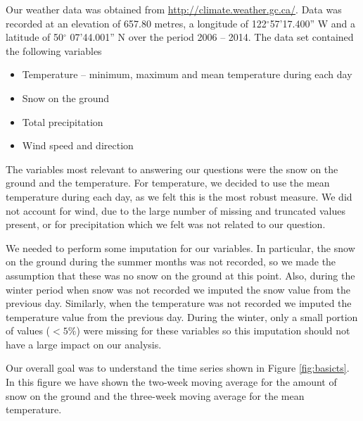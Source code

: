 \documentclass[12pt,twoside]{article}
\begin{document}
{Our weather data was obtained from \url{http://climate.weather.gc.ca/}. Data was recorded at an elevation of 657.80 metres, a longitude of 122$^{\circ}$57'17.400'' W and a latitude of 50$^{\circ}$ 07'44.001'' N over the period 2006 -- 2014. The data set contained the following variables

\begin{itemize}
\item Temperature -- minimum, maximum and mean temperature during each day
\item Snow on the ground 
\item Total precipitation 
\item Wind speed and direction
\end{itemize}

\vspace{-3mm}
\medskip The variables most relevant to answering our questions were the snow on the ground and the temperature. For temperature, we decided to use the mean temperature during each day, as we felt this is the most robust measure. We did not account for wind, due to the large number of missing and truncated values present, or for precipitation which we felt was not related to our question. 

We needed to perform some imputation for our variables. In particular, the snow on the ground during the summer months was not recorded, so we made the assumption that these was no snow on the ground at this point. Also, during the winter period when snow was not recorded we imputed the snow value from the previous day. Similarly, when the temperature was not recorded we imputed the temperature value from the previous day. During the winter, only a small portion of values ($<5\%$) were missing for these variables so this imputation should not have a large impact on our analysis.

Our overall goal was to understand the time series shown in Figure \ref{fig:basicts}. In this figure we have shown the two-week moving average for the amount of snow on the ground and the three-week moving average for the mean temperature.


}
\end{document}

